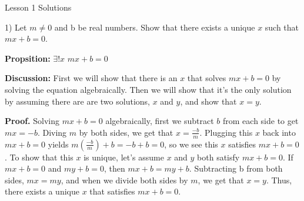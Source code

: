 



	\begin{center}  

		\huge \sc Lesson 1 Solutions 
		
	\end{center}

	\begin{paragraph}{1)}
		Let $m \not = 0$ and b be real numbers. Show that there exists a unique $x$ such that $mx + b = 0$. \spacing

		\separate\spacing

		\textbf{Propsition:} $\exists!x$ $mx + b = 0$ \spacing
		
		\textbf{Discussion:} First we will show that there is an $x$ that solves $mx + b = 0$ by solving 
		the equation algebraically. Then we will show that it's the only 
		solution by assuming there are are two solutions, $x$ and $y$, 
		and show that $x=y$. \spacing
		
		\textbf{Proof.} Solving $mx + b = 0$ algebraically, first we subtract $b$ from each side to get $mx = -b$. 
		Diving $m$ by both sides, we get that $x = \frac{-b}{m}$. 
		Plugging this $x$ back into $mx + b = 0$ yields $m(\frac{-b}{m}) + b = -b + b = 0$, so we see this $x$ satisfies $mx + b = 0$.
		To show that this $x$ is unique, let's assume $x$ and $y$ both satisfy
		$mx + b = 0$. If $mx + b = 0$ and $my + b = 0$, then $mx + b = my + b$.
		Subtracting b from both sides, $mx = my$, and when we divide both sides by $m$, we get that
		$x = y$. Thus, there exists a unique $x$ that satisfies $mx + b = 0$. 

		\proofEnd
	
	\end{paragraph}

